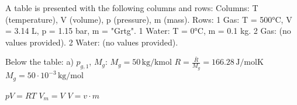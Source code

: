 A table is presented with the following columns and rows:  
Columns: T (temperature), V (volume), p (pressure), m (mass).  
Rows:  
1 Gas: T = 500°C, V = 3.14 L, p = 1.15 bar, m = "Grtg".  
1 Water: T = 0°C, m = 0.1 kg.  
2 Gas: (no values provided).  
2 Water: (no values provided).  

Below the table:  
a) \( p_{g,1} \), \( M_g \):  
\( M_g = 50 \, \text{kg/kmol} \)  
\( R = \frac{\bar{R}}{M_g} = 166.28 \, \text{J/molK} \)  
\( M_g = 50 \cdot 10^{-3} \, \text{kg/mol} \)  

\( pV = RT \)  
\( V_m = V \)  
\( V = v \cdot m \)